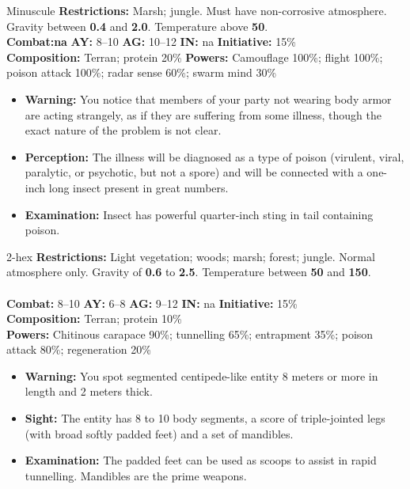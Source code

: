 \hrulefill

  \begin{creature}{Minuscule}
    \textbf{Restrictions:} Marsh; jungle. Must have non-corrosive
    atmosphere. Gravity between \textbf{0.4} and \textbf{2.0}. Temperature above
    \textbf{50\textdegree}.\\
    \textbf{Combat:na}
    \textbf{AY:} 8--10 \textbf{AG:} 10--12 \textbf{IN:} na \textbf{Initiative:} 15\% \\
    \textbf{Composition:} Terran; protein 20\% \textbf{Powers:} Camouflage 100\%; flight 100\%; poison attack 100\%; radar sense 60\%; swarm mind 30\% 
    \begin{itemize}
    \item\textbf{Warning:} You notice that members of your party not wearing body armor are acting strangely, as if they are suffering from some 
      illness, though the exact nature of the problem is not clear. 
    \item\textbf{Perception:} The illness will be diagnosed as a type of poison (virulent, viral, paralytic, or psychotic, but not a spore) and will be 
      connected with a one-inch long insect present in great numbers. 
    \item\textbf{Examination:} Insect has powerful quarter-inch sting in tail containing poison. 
    \end{itemize}
  \end{creature}

\hrulefill

  \begin{creature}{2-hex}
    \textbf{Restrictions:} Light vegetation; woods; marsh; forest; jungle. Normal atmosphere only. Gravity of \textbf{0.6} to \textbf{2.5}. Temperature between \textbf{50\textdegree} 
    and \textbf{150\textdegree}. \\\\
    \textbf{Combat:} 8--10 \textbf{AY:} 6--8 \textbf{AG:} 9--12 \textbf{IN:} na \textbf{Initiative:} 15\% \\
    \textbf{Composition:} Terran; protein 10\% \\
    \textbf{Powers:} Chitinous carapace 90\%; tunnelling 65\%; entrapment 35\%; poison attack 80\%; regeneration 20\% 
    \begin{itemize}
    \item\textbf{Warning:} You spot segmented centipede-like entity 8 meters or more in length and 2 meters thick. 
    \item\textbf{Sight:} The entity has 8 to 10 body segments, a score of triple-jointed legs (with broad softly padded feet) and a set of mandibles. 
    \item\textbf{Examination:} The padded feet can be used as scoops to assist in rapid tunnelling. Mandibles are the prime weapons. 
    \end{itemize}
  \end{creature}

